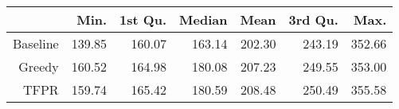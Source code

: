 \begin{table}[ht]
\centering
\begin{tabular}{rrrrrrr}
  \hline
 & Min. & 1st Qu. & Median & Mean & 3rd Qu. & Max. \\ 
  \hline
Baseline & 139.85 & 160.07 & 163.14 & 202.30 & 243.19 & 352.66 \\ 
  Greedy & 160.52 & 164.98 & 180.08 & 207.23 & 249.55 & 353.00 \\ 
  TFPR & 159.74 & 165.42 & 180.59 & 208.48 & 250.49 & 355.58 \\ 
   \hline
\end{tabular}
\end{table}

